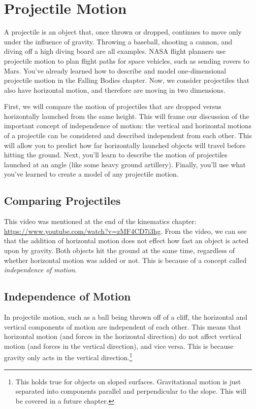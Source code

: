 \chapter{Projectile Motion}

A projectile is an object that, once thrown or dropped, continues to move only 
under the influence of gravity. Throwing a baseball, shooting a cannon, and 
diving off a high diving board are all examples. NASA flight planners use 
projectile motion to plan flight paths for space vehicles, such as sending 
rovers to Mars. You've already learned how to describe and model 
one-dimensional projectile motion in the Falling Bodies chapter. Now, we 
consider projectiles that also have horizontal motion, and therefore are 
moving in two dimensions. 

First, we will compare the motion of projectiles that are dropped versus 
horizontally launched from the same height. This will frame our discussion of 
the important concept of independence of motion: the vertical and horizontal 
motions of a projectile can be considered and described independent from each 
other. This will allow you to predict how far horizontally launched objects 
will travel before hitting the ground. Next, you'll learn to describe the 
motion of projectiles launched at an angle (like some heavy ground artillery). 
Finally, you'll use what you've learned to create a model of any projectile motion. 

\section{Comparing Projectiles}
This video was mentioned at the end of the kinematics chapter: \url{https://www.youtube.com/watch?v=zMF4CD7i3hg}.
From the video, we can see that the addition of horizontal motion does not effect how fast an object is acted upon by gravity. Both objects hit the ground at the same time, regardless of whether horizontal motion was added or not. This is because of a concept called \emph{independence of motion}.


\section{Independence of Motion}
In projectile motion, such as a ball being thrown off of a cliff, the horizontal and vertical components of motion are independent of each other. This means that horizontal motion (and forces in the horizontal direction) do not affect vertical motion (and forces in the vertical direction), and vice versa. This is because gravity only acts in the vertical direction.\footnote{This holds true for objects on sloped surfaces. Gravitational motion is just separated into components parallel and perpendicular to the slope. This will be covered in a future chapter.}

